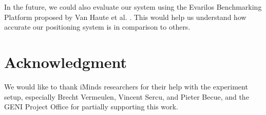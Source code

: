 \documentclass[journal]{IEEEtran} 				\IEEEoverridecommandlockouts 						\usepackage{amsmath,amssymb}
\begin{document}
In the future, we could also evaluate our system using the Evarilos Benchmarking Platform proposed by Van Haute et al. \cite{vanhaute15_platform}. This would help us understand how accurate our positioning system is in comparison to others.

\section*{Acknowledgment}
We would like to thank iMinds researchers for their help with the experiment setup, especially Brecht Vermeulen, Vincent Sercu, and Pieter Becue,
and the GENI Project Office for partially supporting this work.




\end{document}
